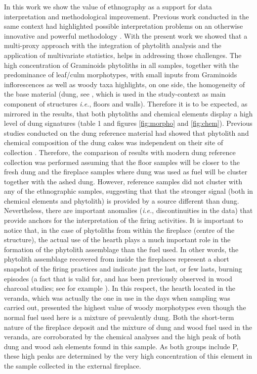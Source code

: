 \documentclass[authoryear,preprint,review,12pt]{elsarticle}
\begin{document}
In this work we show the value of ethnography as a support for data interpretation and methodological improvement. Previous work conducted in the same context had highlighted possible interpretation problems on an otherwise innovative and powerful methodology \citep{Rondelli2014}. With the present work we showed that a multi-proxy approach with the integration of phytolith analysis and the application of multivariate statistics, helps in addressing those challenges. The high concentration of Graminoids phytoliths in all samples, together with the predominance of leaf/culm morphotypes, with small inputs from Graminoids inflorescences as well as woody taxa highlights, on one side, the homogeneity of the base material (dung, see \citealt{Lancelotti2012}, which is used in the study-context as main component of structures \emph{i.e.}, floors and walls). Therefore it is to be expected, as mirrored in the results, that both phytoliths and chemical elements display a high level of dung signatures (table 1 and figures \ref{fig:morpho} and \ref{fig:chem}). Previous studies conducted on the dung reference material had showed that phytolith and chemical composition of the dung cakes was independent on their site of collection \citep{Lancelotti2012}. Therefore, the comparison of results with modern dung reference collection was performed assuming that the floor samples will be closer to the fresh dung and the fireplace samples where dung was used as fuel will be cluster together with the ashed dung. However, reference samples did not cluster with any of the ethnographic samples, suggesting that that the stronger signal (both in chemical elements and phytolith) is provided by a source different than dung. Nevertheless, there are important anomalies (\textit{i.e.}, discontinuities in the data) that provide anchors for the interpretation of the firing activities. It is important to notice that, in the case of phytoliths from within the fireplace (centre of the structure), the actual use of the hearth plays a much important role in the formation of the phytolith assemblage than the fuel used. In other words, the phytolith assemblage recovered from inside the fireplaces represent a short snapshot of the firing practices and indicate just the last, or few lasts, burning episodes (a fact that is valid for, and has been previously observed in wood charcoal studies; see for example \citealt{Chabal1997}). In this respect, the hearth located in the veranda, which was actually the one in use in the days when sampling was carried out, presented the highest value of woody morphotypes even though the normal fuel used here is a mixture of prevalently dung. Both the short-term nature of the fireplace deposit and the mixture of dung and wood fuel used in the veranda, are corroborated by the chemical analyses and the high peak of both dung and wood ash elements found in this sample. As both groups include P, these high peaks are determined by the very high concentration of this element in the sample collected in the external fireplace.\par
\end{document}
